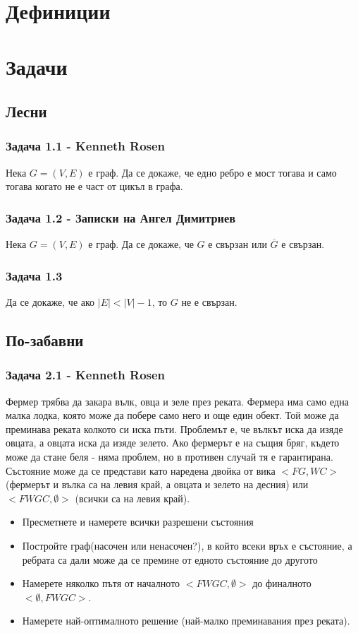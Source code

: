 \documentclass[12pt]{article}
\begin{document}
\section*{Дефиниции}

\section*{Задачи}

\subsection*{Лесни}
\subsubsection*{Задача 1.1 - Kenneth Rosen}
Нека $G = (V, E)$ е граф. Да се докаже, че едно ребро е мост тогава и само тогава когато не е част от цикъл в графа. 
\subsubsection*{Задача 1.2 - Записки на Ангел Димитриев}
Нека $G = (V, E)$ е граф. Да се докаже, че $G$ е свързан или $\overline{G}$ е свързан. 
\subsubsection*{Задача 1.3}
Да се докаже, че ако $|E| < |V| - 1$, то $G$ не е свързан.

\subsection*{По-забавни}
\subsubsection*{Задача 2.1 - Kenneth Rosen}
Фермер трябва да закара вълк, овца и зеле през реката. Фермера има само една малка лодка, която може да побере само него и още един обект. Той може да преминава реката колкото си иска пъти. Проблемът е, че вълкът иска да изяде овцата, а овцата иска да изяде зелето. Ако фермерът е на същия бряг, където може да стане беля - няма проблем, но в противен случай тя е гарантирана. Състояние може да се представи като наредена двойка от вика $<FG, WC>$(фермерът и вълка са на левия край, а овцата и зелето на десния) или $<FWGC, \emptyset>$ (всички са на левия край).

\begin{itemize}
    \item Пресметнете и намерете всички разрешени състояния
    \item Постройте граф(насочен или ненасочен?), в който всеки връх е състояние, а ребрата са дали може да се премине от едното състояние до другото
    \item Намерете няколко пътя от началното $<FWGC, \emptyset>$ до финалното $<\emptyset, FWGC>$.
    \item Намерете най-оптималното решение (най-малко преминавания през реката).
\end{itemize}
\end{document}
